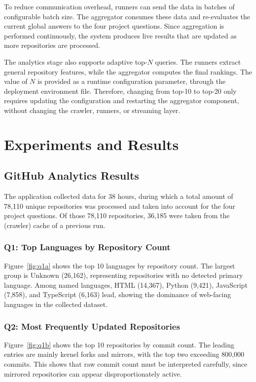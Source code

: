 \documentclass[conference]{IEEEtran}
\begin{document}
To reduce communication overhead, runners can send the data in batches of
configurable batch size. The aggregator consumes these data and re-evaluates the
current global answers to the four project questions. Since aggregation is
performed continuously, the system produces live results that are updated as
more repositories are processed.

The analytics stage also supports adaptive top-$N$ queries. The runners extract
general repository features, while the aggregator computes the final rankings.
The value of $N$ is provided as a runtime configuration parameter, through the
deployment environment file. Therefore, changing from top-10 to top-20 only
requires updating the configuration and restarting the aggregator component,
without changing the crawler, runners, or streaming layer.

\section{Experiments and Results}
\label{sec:experiments}

\subsection{GitHub Analytics Results}
The application collected data for 38 hours, during which a total amount of
78,110 unique repositories was processed and taken into account for the four
project questions. Of those 78,110 repositories, 36,185 were taken from the
(crawler) cache of a previous run.

\subsubsection{Q1: Top Languages by Repository Count}
Figure~\ref{fig:q1a} shows the top 10 languages by repository count. The largest
group is Unknown (26,162), representing repositories with no detected primary
language. Among named languages, HTML (14,367), Python (9,421), JavaScript
(7,858), and TypeScript (6,163) lead, showing the dominance of web-facing
languages in the collected dataset.

\subsubsection{Q2: Most Frequently Updated Repositories}
Figure~\ref{fig:q1b} shows the top 10 repositories by commit count. The leading
entries are mainly kernel forks and mirrors, with the top two
exceeding 800,000 commits. This shows that raw commit count
must be interpreted carefully, since mirrored repositories can
appear disproportionately active.
\end{document}
